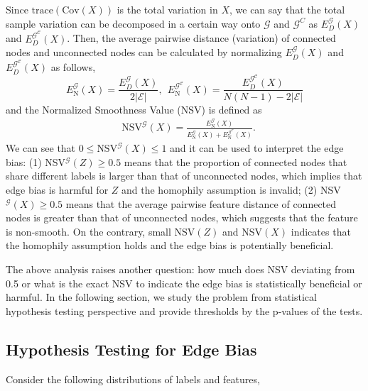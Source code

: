 \documentclass{article}
\newcommand{\trace}{\mathrm{trace}}
\newcommand{\0}{{\boldsymbol{0}}}
\newcommand{\6}{{\partial}}
\newcommand{\8}{{\infty}}
\newcommand{\4}{{\nabla}}
\providecommand{\abs}[1]{\left| #1 \right|}
\begin{document}
Since $\trace \left(\text{Cov}(X)\right)$ is the total variation in $X$, we can say that the total sample variation can be decomposed in a certain way onto $\mathcal{G}$ and $\mathcal{G}^C$ as $E_D^\mathcal{G}({X})$ and $E_D^\mathcal{G^C}({X})$. Then, the average pairwise distance (variation) of connected nodes and unconnected nodes can be calculated by normalizing $E_D^\mathcal{G}({X})$ and $E_D^\mathcal{G^C}({X})$ as follows,
\begin{equation}  
 E_{\text{N}}^\mathcal{G}({X}) = \frac{E_D^\mathcal{G}({X}) }{2\abs{\mathcal{E}}}, \ \ E_{\text{N}}^\mathcal{G^C}({X}) = \frac{E_D^\mathcal{G^C}({X})}{N(N-1)-2\abs{\mathcal{E}}}
\end{equation}
and the Normalized Smoothness Value (NSV) is defined as
\begin{equation}
    \begin{aligned}
    &\text{NSV}^\mathcal{G}(X) = \frac{E_{\text{N}}^\mathcal{G}({X})}{E_{\text{N}}^\mathcal{G}({X}) + E_{\text{N}}^\mathcal{G^C}({X})}. \end{aligned}  
\end{equation}
We can see that $0 \leq \text{NSV}^\mathcal{G}(X) \leq 1$ and it can be used to interpret the edge bias: (1) NSV$^\mathcal{G}(Z) \geq 0.5$ means that the proportion of connected nodes that share different labels is larger than that of unconnected nodes, which implies that edge bias is harmful for $Z$ and the homophily assumption is invalid; (2) NSV$^\mathcal{G}(X) \geq 0.5$ means that the average pairwise feature distance of connected nodes is greater than that of unconnected nodes, which suggests that the feature is non-smooth. On the contrary, small NSV$(Z)$ and NSV$(X)$ indicates that the homophily assumption holds and the edge bias is potentially beneficial.

The above analysis raises another question: how much does NSV deviating from 0.5 or what is the exact NSV to indicate the edge bias is statistically beneficial or harmful. In the following section, we study the problem from statistical hypothesis testing perspective and provide thresholds by the p-values of the tests.
\subsection{Hypothesis Testing for Edge Bias}
Consider the following distributions of labels and features,
\end{document}

